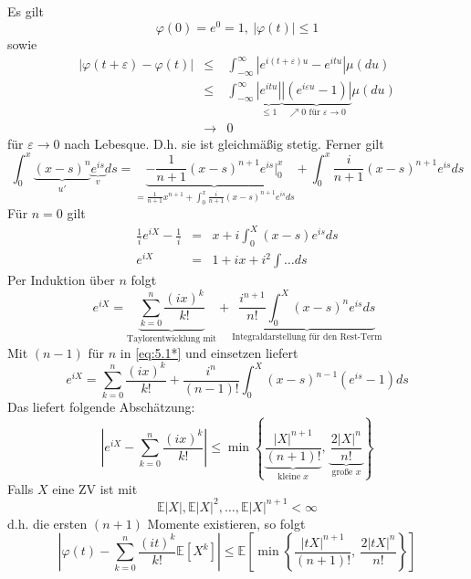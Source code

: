 \documentclass[10pt,a4paper]{report}
\numberwithin{equation}{section}
\numberwithin{figure}{section}
\theoremstyle{plain}
\theoremstyle{definition}
\theoremstyle{remark}
\theoremstyle{plain}
\newcommand{\1}{ \mathbb{1} } %
\begin{document}
Es gilt
\[
\varphi\left(0\right)=e^{0}=1,\ \left|\varphi\left(t\right)\right|\leq1
\]
sowie 
\begin{eqnarray*}
\left|\varphi\left(t+\varepsilon\right)-\varphi\left(t\right)\right| & \leq & \int_{-\infty}^{\infty}\left|e^{i\left(t+\varepsilon\right)u}-e^{itu}\right|\mu\left(du\right)\\
 & \leq & \int_{-\infty}^{\infty}\underset{\leq1}{\underbrace{\left|e^{itu}\right|}}\underset{\nearrow0\text{ für }\varepsilon\to0}{\underbrace{\left|\left(e^{i\varepsilon u}-1\right)\right|}}\mu\left(du\right)\\
 & \to & 0
\end{eqnarray*}
für $\varepsilon\to0$ nach Lebesque. D.h. sie ist gleichmäßig stetig.
Ferner gilt 
\begin{equation}
\int_{0}^{x}\underset{u'}{\underbrace{\left(x-s\right)^{n}}}\underset{v}{\underbrace{e^{is}}}ds=\underset{=\frac{1}{n+1}x^{n+1}+\int_{0}^{x}\frac{i}{n+1}\left(x-s\right)^{n+1}e^{is}ds}{\underbrace{-\frac{1}{n+1}\left(x-s\right)^{n+1}e^{is}|_{0}^{x}}}+\int_{0}^{x}\frac{i}{n+1}\left(x-s\right)^{n+1}e^{is}ds\label{eq:5.1*}
\end{equation}
Für $n=0$ gilt
\begin{eqnarray*}
\frac{1}{i}e^{iX}-\frac{1}{i} & = & x+i\int_{0}^{X}\left(x-s\right)e^{is}ds\\
e^{iX} & = & 1+ix+i^{2}\int\ldots ds
\end{eqnarray*}
Per Induktion über $n$ folgt
\[
e^{iX}=\underset{\mbox{Taylorentwicklung mit}}{\underbrace{\sum_{k=0}^{n}\frac{\left(ix\right)^{k}}{k!}}}+\underset{\mbox{Integraldarstellung für den Rest-Term}}{\underbrace{\frac{i^{n+1}}{n!}\int_{0}^{X}\left(x-s\right)^{n}e^{is}ds}}
\]
Mit $\left(n-1\right)$ für $n$ in \ref{eq:5.1*} und einsetzen liefert
\[
e^{iX}=\sum_{k=0}^{n}\frac{\left(ix\right)^{k}}{k!}+\frac{i^{n}}{\left(n-1\right)!}\int_{0}^{X}\left(x-s\right)^{n-1}\left(e^{is}-1\right)ds
\]
Das liefert folgende Abschätzung:
\[
\left|e^{iX}-\sum_{k=0}^{n}\frac{\left(ix\right)^{k}}{k!}\right|\leq\min\left\{ \underset{\mbox{kleine }x}{\underbrace{\frac{\left|X\right|^{n+1}}{\left(n+1\right)!}}},\ \underset{\mbox{große }x}{\underbrace{\frac{2\left|X\right|^{n}}{n!}}}\right\} 
\]
Falls $X$ eine ZV ist mit 
\[
\mathbb{E}\left|X\right|,\mathbb{E}\left|X\right|^{2},\ldots,\mathbb{E}\left|X\right|^{n+1}<\infty
\]
d.h. die ersten $\left(n+1\right)$ Momente existieren, so folgt
\[
\left|\varphi\left(t\right)-\sum_{k=0}^{n}\frac{\left(it\right)^{k}}{k!}\mathbb{E}\left[X^{k}\right]\right|\leq\mathbb{E}\left[\min\left\{ \frac{\left|tX\right|^{n+1}}{\left(n+1\right)!},\ \frac{2\left|tX\right|^{n}}{n!}\right\} \right]
\]
\end{document}
